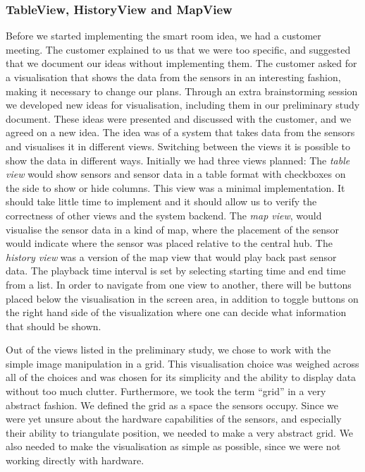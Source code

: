 \documentclass[../document.tex]{subfiles}
\begin{document}
\subsubsection{TableView, HistoryView and MapView}
Before we started implementing the smart room idea, we had a customer meeting. The customer explained to us that we were too specific, and suggested that we document our ideas without implementing them. The customer asked for a visualisation that shows the data from the sensors in an interesting fashion, making it necessary to change our plans. Through an extra brainstorming session we developed new ideas for visualisation, including them in our preliminary study document. These ideas were presented and discussed with the customer, and we agreed on a new idea. The idea was of a system that takes data from the sensors and visualises it in different views. Switching between the views it is possible to show the data in different ways. Initially we had three views planned: The \emph{table view} would show sensors and sensor data in a table format with checkboxes on the side to show or hide columns.  This view was a minimal implementation. It should take little time to implement and it should allow us to verify the correctness of other views and the system backend. The \emph{map view}, would visualise the sensor data in a kind of map, where the placement of the sensor would indicate where the sensor was placed relative to the central hub. The \emph{history view} was a version of the map view that would play back past sensor data. The playback time interval is set by selecting starting time and end time from a list. In order to navigate from one view to another, there will be buttons placed below the visualisation in the screen area, in addition to toggle buttons on the right hand side of the visualization where one can decide what information that should be shown. 

Out of the views listed in the preliminary study, we chose to work with the simple image manipulation in a grid. This visualisation choice was weighed across all of the choices and was chosen for its simplicity and the ability to display data without too much clutter. Furthermore, we took the term “grid” in a very abstract fashion. We defined the grid as a space the sensors occupy. Since we were yet unsure about the hardware capabilities of the sensors, and especially their ability to triangulate position, we needed to make a very abstract grid. We also needed to make the visualisation as simple as possible, since we were not working directly with hardware.
\end{document}
